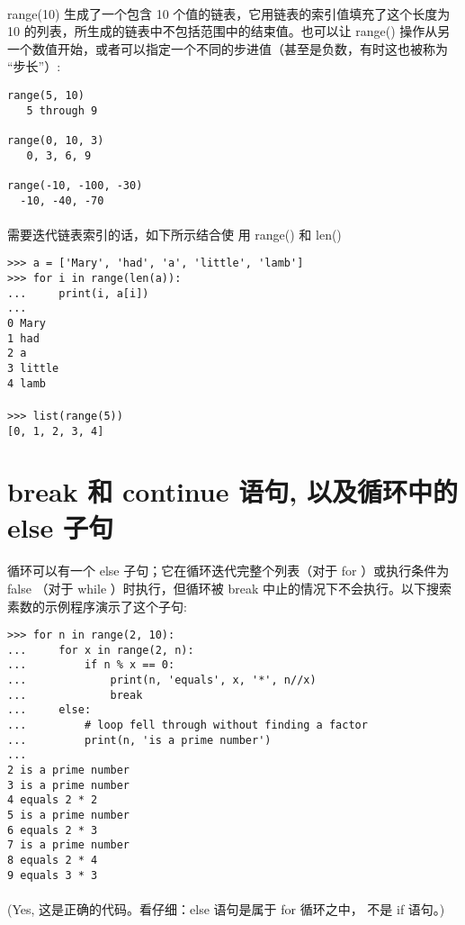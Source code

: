 \documentclass{article}
\begin{document}
\begin{CJK}{UTF8}{gbsn}
\paragraph{}
range(10) 生成了一个包含 10 个值的链表，它用链表的索引值填充了这个长度为 10 的列表，所生成的链表中不包括范围中的结束值。也可以让 range() 操作从另一个数值开始，或者可以指定一个不同的步进值（甚至是负数，有时这也被称为 “步长”）:
\begin{verbatim}
range(5, 10)
   5 through 9

range(0, 10, 3)
   0, 3, 6, 9

range(-10, -100, -30)
  -10, -40, -70
\end{verbatim}
\paragraph{}
需要迭代链表索引的话，如下所示结合使 用 range() 和 len()
\begin{verbatim}
>>> a = ['Mary', 'had', 'a', 'little', 'lamb']
>>> for i in range(len(a)):
...     print(i, a[i])
...
0 Mary
1 had
2 a
3 little
4 lamb
\end{verbatim}
\paragraph{}
\begin{verbatim}
>>> list(range(5))
[0, 1, 2, 3, 4]
\end{verbatim}
\section{ break 和 continue 语句, 以及循环中的 else 子句}
\paragraph{}
循环可以有一个 else 子句；它在循环迭代完整个列表（对于 for ）或执行条件为 false （对于 while ）时执行，但循环被 break 中止的情况下不会执行。以下搜索素数的示例程序演示了这个子句:
\begin{verbatim}
>>> for n in range(2, 10):
...     for x in range(2, n):
...         if n % x == 0:
...             print(n, 'equals', x, '*', n//x)
...             break
...     else:
...         # loop fell through without finding a factor
...         print(n, 'is a prime number')
...
2 is a prime number
3 is a prime number
4 equals 2 * 2
5 is a prime number
6 equals 2 * 3
7 is a prime number
8 equals 2 * 4
9 equals 3 * 3
\end{verbatim}
\paragraph{}
(Yes, 这是正确的代码。看仔细：else 语句是属于 for 循环之中， 不是 if 语句。)

\end{CJK}
\end{document}
